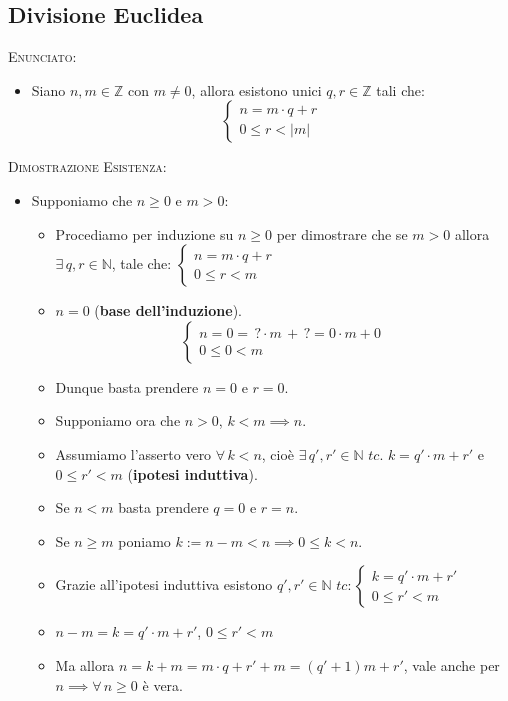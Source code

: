 \documentclass[10pt]{article}
\begin{document}
\subsection{Divisione Euclidea}
\textsc{Enunciato:}
\begin{itemize}
\item
Siano $n,m \in \mathbb{Z}$ con $m \neq 0$, allora esistono unici $q,r \in \mathbb{Z}$ tali che:
\[
\begin{cases}
n=m \cdot q + r \\
0 \leq r < |m|
\end{cases}
\]
\end{itemize}
\textsc{Dimostrazione Esistenza:}
\begin{itemize}
\item
Supponiamo che $n \geq 0$ e $m > 0$:
\begin{itemize}
\item
Procediamo per induzione su $n \geq 0$ per dimostrare che se $m \!>\! 0$ allora $\exists \, q,r \in \mathbb{N}$, tale che: $\begin{cases} n = m \cdot q + r \\ 0 \leq r < m \end{cases}$
\item
$n=0$ (\textbf{base dell'induzione}).
$$\begin{cases} n = 0 = \,? \cdot m \, + \, ? = 0 \cdot m + 0 \\ 0 \leq 0 < m \end{cases}$$
\item
Dunque basta prendere $n = 0$ e $r=0$.
\item
Supponiamo ora che $n > 0$, $k < m \implies n$.
\item
Assumiamo l'asserto vero $\forall \, k < n$, cioè $\exists \, q', r' \in \mathbb{N} \,\, tc. \,\, k = q' \cdot m + r'$ e $0 \leq r' < m$ (\textbf{ipotesi induttiva}).
\item
Se $n < m$ basta prendere $q = 0$ e $r = n$.
\item
Se $n \geq m$ poniamo $k := n - m < n \implies 0 \leq k < n$.
\item
Grazie all'ipotesi induttiva esistono $q', r' \in \mathbb{N} \,\,tc:\begin{cases} k = q' \cdot m + r' \\ 0 \leq r' < m \end{cases}$
\item
$n-m = k = q' \cdot m + r'$, $0 \leq r' < m$
\item
Ma allora $n = k + m = m \cdot q + r' + m = (q' + 1)m + r'$, vale anche per $n \implies \forall \,n \geq 0$ è vera.

\end{itemize}
\end{itemize}
\end{document}

